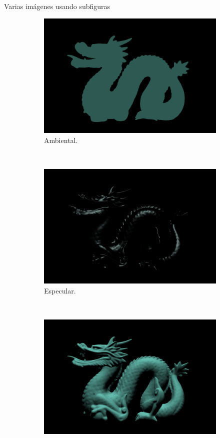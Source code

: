 \begin{frame}{Varias imágenes usando subfiguras}
\begin{figure}[htp]
 \centering
 \begin{subfigure}[b]{0.17\textwidth}
   \includegraphics[width=\textwidth]{img/ambiente}
   \caption{Ambiental.}
 \label{fig:2a}
 \end{subfigure}
~
 \begin{subfigure}[b]{0.17\textwidth}
   \includegraphics[width=\textwidth]{img/especular}
   \caption{Especular.}
   \label{fig:2b}
 \end{subfigure}
~
 \begin{subfigure}[b]{0.17\textwidth}
   \includegraphics[width=\textwidth]{img/difuso}

\end{subfigure}
\end{figure}
\end{frame}
